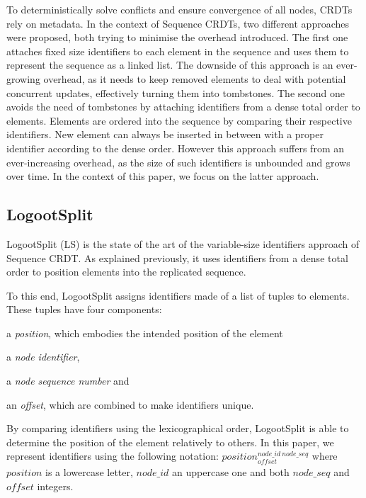 \documentclass[10pt,journal,compsoc]{IEEEtran}
\newcommand{\trm}[1]{\mathit{#1}}
\newcommand{\id}[3]{$\trm{#1}^{\trm{#2}}_{\trm{#3}}$}
\begin{document}
To deterministically solve conflicts and ensure convergence of all nodes, \acp{CRDT} rely on metadata.
In the context of Sequence \acp{CRDT}, two different approaches were proposed, both trying to minimise the overhead introduced.
The first one \cite{oster:inria-00108523, Weiss_2007, ahmednacer:inria-00629503, ROH2011354, briot:hal-01343941} attaches fixed size identifiers to each element in the sequence and uses them to represent the sequence as a linked list.
The downside of this approach is an ever-growing overhead, as it needs to keep removed elements to deal with potential concurrent updates, effectively turning them into tombstones.
The second one \cite{5158449,WeissICDCS09,weiss:hal-00450416,AndreCollaborateCom2013,lseq2013,lseq2017} avoids the need of tombstones by attaching identifiers from a dense total order to elements.
Elements are ordered into the sequence by comparing their respective identifiers.
New element can always be inserted in between with a proper identifier according to the dense order.
However this approach suffers from an ever-increasing overhead, as the size of such identifiers is unbounded and grows over time.
In the context of this paper, we focus on the latter approach.


\subsection{LogootSplit}

LogootSplit (LS) \cite{AndreCollaborateCom2013} is the state of the art of the variable-size identifiers approach of Sequence \ac{CRDT}.
As explained previously, it uses identifiers from a dense total order to position elements into the replicated sequence.

To this end, LogootSplit assigns identifiers made of a list of tuples to elements.
These tuples have four components:
\begin{enumerate*}[label=(\roman*)]
    \item a \emph{position}, which embodies the intended position of the element
    \item a \emph{node identifier},
    \item a \emph{node sequence number} and
    \item an \emph{offset}, which are combined to make identifiers unique.
\end{enumerate*}
By comparing identifiers using the lexicographical order, LogootSplit is able to determine the position of the element relatively to others.
In this paper, we represent identifiers using the following notation: \id{position}{node\_id~node\_seq}{offset} where $\trm{position}$ is a lowercase letter, $\trm{node\_id}$ an uppercase one and both $\trm{node\_seq}$ and $\trm{offset}$ integers.
\end{document}
